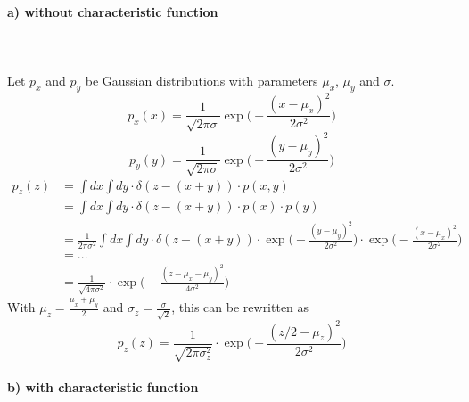 \paragraph{a) without characteristic function} \ \\ 
\\
Let $p_x$ and $p_y$ be Gaussian distributions with 
parameters $\mu_x$, $\mu_y$ and $\sigma$.
\begin{equation}
    p_x(x)=\frac{1}{\sqrt{2\pi\sigma}}
    \exp\bigg(-\frac{(x-\mu_x)^2}{2\sigma^2}\bigg)
\end{equation}
\begin{equation}
    p_y(y)=\frac{1}{\sqrt{2\pi\sigma}}
    \exp\bigg(-\frac{(y-\mu_y)^2}{2\sigma^2}\bigg)
\end{equation}
\begin{align}
    p_z(z)
    &=\int dx\int dy\cdot\delta(z-(x+y))\cdot p(x,y) \\
    &=\int dx\int dy\cdot\delta(z-(x+y))\cdot p(x)\cdot p(y) \\
    &=\frac{1}{2\pi\sigma^2}\int dx\int dy\cdot
    \delta(z-(x+y))\cdot
    \exp\bigg(-\frac{(y-\mu_y)^2}{2\sigma^2}\bigg)\cdot
    \exp\bigg(-\frac{(x-\mu_x)^2}{2\sigma^2}\bigg) \\
    &=... \\
    &=\frac{1}{\sqrt{4\pi\sigma^2}}\cdot
    \exp\bigg(-\frac{(z-\mu_x-\mu_y)^2}{4\sigma^2}\bigg)
\end{align}
With $\mu_z=\frac{\mu_x+\mu_y}{2}$
and $\sigma_z=\frac{\sigma}{\sqrt{2}}$, this can be 
rewritten as
\begin{equation}
    p_z(z)
    =\frac{1}{\sqrt{2\pi\sigma_z^2}}\cdot
    \exp\bigg(-\frac{(z/2-\mu_z)^2}{2\sigma^2}\bigg)
\end{equation}

\paragraph{b) with characteristic function} \ \\

